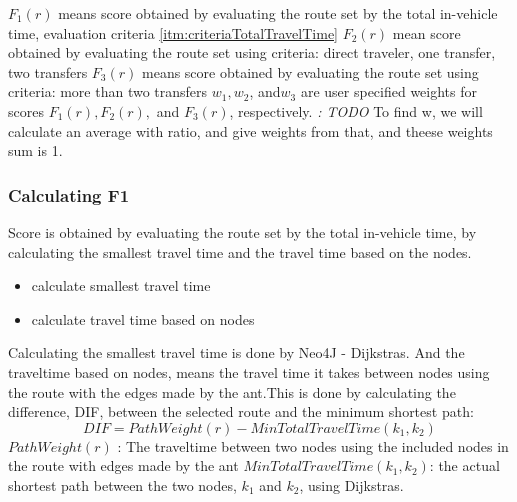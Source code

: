 $ F_{1}(r)$ means score obtained by evaluating the route set by the total in-vehicle time, evaluation criteria \ref{itm:criteriaTotalTravelTime}
\newline
$ F_{2}(r)$ mean score obtained by evaluating the route set using criteria: direct traveler, one transfer, two transfers
\newline
$ F_{3}(r)$ means score obtained by evaluating the route set using criteria: more than two transfers 
\newline
$ w_{1}, w_{2}$, and$ w_{3}$ are user specified weights for scores $ F_{1}(r), F_{2}(r),$ and $ F_{3}(r)$, respectively. \textit{: TODO}
To find w, we will calculate an average with ratio, and give weights from that, and theese weights sum is 1.  

\subsubsection{Calculating F1}
Score is obtained by evaluating the route set by the total in-vehicle time, by calculating the smallest travel time and the travel time based on the nodes.
\begin{itemize}
\item calculate smallest travel time
\item calculate travel time based on nodes
\end{itemize}

Calculating the smallest travel time is done by Neo4J - Dijkstras. 
And the traveltime based on nodes, means the travel time it takes between nodes using the route with the edges made by the ant.This is done by calculating the difference, DIF, between the selected route and the minimum shortest path:
$$ DIF = PathWeight(r) - MinTotalTravelTime(k_{1},k_{2})$$
$ PathWeight(r)$ : The traveltime between two nodes using the included nodes in the route with edges made by the ant
\newline
$ MinTotalTravelTime(k_{1},k_{2})$: the actual shortest path between the two nodes, $k_{1}$ and $k_{2}$, using Dijkstras.



